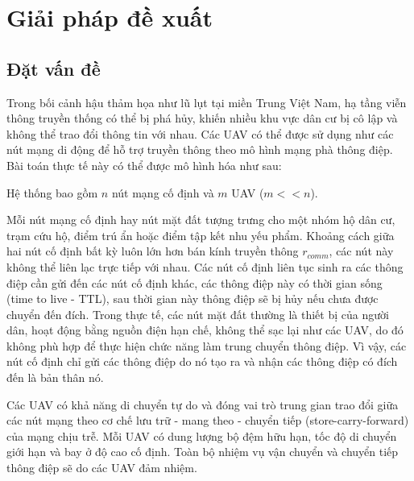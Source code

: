 \documentclass[a4paper]{article}
\begin{document}
\section{Giải pháp đề xuất}
\subsection{Đặt vấn đề}

Trong bối cảnh hậu thảm họa như lũ lụt tại miền Trung Việt Nam, hạ tầng viễn thông truyền thống có thể bị phá hủy, khiến nhiều khu vực dân cư bị cô lập và không thể trao đổi thông tin với nhau. Các UAV có thể được sử dụng như các nút mạng di động để hỗ trợ truyền thông theo mô hình mạng phà thông điệp. Bài toán thực tế này có thể được mô hình hóa như sau:

Hệ thống bao gồm $n$ nút mạng cố định và $m$ UAV ($m<<n$). 

Mỗi nút mạng cố định hay nút mặt đất tượng trưng cho một nhóm hộ dân cư, trạm cứu hộ, điểm trú ẩn hoặc điểm tập kết nhu yếu phẩm. Khoảng cách giữa hai nút cố định bất kỳ luôn lớn hơn bán kính truyền thông $r_{comm}$, các nút này không thể liên lạc trực tiếp với nhau. 
Các nút cố định liên tục sinh ra các thông điệp cần gửi đến các nút cố định khác, các thông điệp này có thời gian sống (time to live - TTL), sau thời gian này thông điệp sẽ bị hủy nếu chưa được chuyển đến đích.
Trong thực tế, các nút mặt đất thường là thiết bị của người dân, hoạt động bằng nguồn điện hạn chế, không thể sạc lại như các UAV, do đó không phù hợp để thực hiện chức năng làm trung chuyển thông điệp. Vì vậy, các nút cố định chỉ gửi các thông điệp do nó tạo ra và nhận các thông điệp có đích đến là bản thân nó. 

Các UAV có khả năng di chuyển tự do và đóng vai trò trung gian trao đổi giữa các nút mạng theo cơ chế lưu trữ - mang theo - chuyển tiếp (store-carry-forward) của mạng chịu trễ.
Mỗi UAV có dung lượng bộ đệm hữu hạn, tốc độ di chuyển giới hạn và bay ở độ cao cố định.
Toàn bộ nhiệm vụ vận chuyển và chuyển tiếp thông điệp sẽ do các UAV đảm nhiệm.
\end{document}
